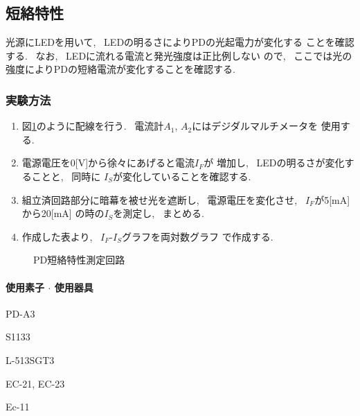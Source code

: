 \documentclass[titlepage]{jsarticle}
\begin{document}
    \subsection{短絡特性} \label{短絡特性}
        光源にLEDを用いて, ~LEDの明るさによりPDの光起電力が変化する
        ことを確認する. ~なお, ~LEDに流れる電流と発光強度は正比例しない
        ので, ~ここでは光の強度によりPDの短絡電流が変化することを確認する.

        \subsubsection{実験方法}
            \begin{enumerate}
                \item 図\ref{fig:短絡特性回路}のように配線を行う.
                    ~電流計$A_1$, $A_2$にはデジダルマルチメータを
                    使用する.
                \item 電源電圧を0[V]から徐々にあげると電流$I_F$が
                    増加し, ~LEDの明るさが変化することと, ~同時に
                    $I_S$が変化していることを確認する.
                \item 組立済回路部分に暗幕を被せ光を遮断し,
                    ~電源電圧を変化させ, ~$I_F$が5[mA]から20[mA]
                    の時の$I_S$を測定し, ~まとめる.
                \item 作成した表より, ~$I_F$-$I_S$グラフを両対数グラフ
                    で作成する.
            \end{enumerate}

            \begin{figure}[ht]
                \centering
                \caption{PD短絡特性測定回路}
                \label{fig:短絡特性回路}
            \end{figure}
            
            \paragraph{使用素子 $\cdot$ 使用器具}
                \begin{description}
                    \setlength{\leftskip}{1.5em}
                    \item[組立済回路] PD-A3
                    \item[PD] S1133
                    \item[LED] L-513SGT3
                    \item[デジタルマルチメータ] EC-21, EC-23
                    \item[直流電源] Ec-11
                \end{description}
\end{document}
